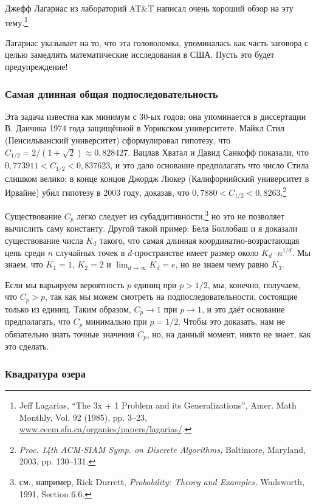 Джефф Лагариас из лабораторий AT\&T написал очень хороший обзор на эту тему.\footnote{Jeff Lagarias, ``The 3x + 1 Problem and its Generalizations'', Amer. Math Monthly, Vol. 92 (1985), pp. 3--23, \href{http://www.cecm.sfu.ca/organics/papers/lagarias/}{www.cecm.sfu.ca/organics/papers/lagarias/}.}

Лагариас указывает на то, что эта головоломка, упоминалась как часть заговора с целью замедлить математические исследования в США.
Пусть это будет предупреждение!

\subsubsection*{Самая длинная общая подпоследовательность}

Эта задача известна как минимум с 30-ых годов; она упоминается в диссертации В. Данчика 1974 года защищённой в Уорикском университете.
Майкл Стил (Пенсильванский университет) сформулировал гипотезу, что $C_{1/2} = 2/(1+\sqrt{2})\approx 0{,}828427$.
Вацлав Хватал и Давид Санкофф показали, что $0{,}773911 < C_{1/2} < 0{,}837623$, и это дало основание предполагать что число Стила слишком велико;
в конце концов Джордж Люкер (Калифорнийский университет в Ирвайне) убил гипотезу в 2003 году, доказав, что $0{,}7880 < C_{1/2} < 0{,}8263$.\footnote{\textit{Proc. 14th ACM-SIAM Symp. on Discrete Algorithms,} Baltimore, Maryland, 2003, pp. 130--131.}

Существование $C_p$ легко следует из субаддитивности,\footnote{см., например, Rick Durrett, \textit{Probability: Theory and Examples,} Wadsworth, 1991, Section 6.6.} но это не позволяет вычислить саму константу.
Другой такой пример: Бела Боллобаш и я доказали существование числа $K_d$ такого, что самая длинная координатно-возрастающая цепь среди $n$ случайных точек в $d$-пространстве имеет размер около $K_d\cdot n^{1/d}$.
Мы знаем, что $K_1=1$, $K_2=2$ и $\lim_{d\to\infty} K_d=e$, но не знаем чему равно $K_3$.

Если мы варьируем вероятность $p$ единиц при $p > 1/2$, мы, конечно, получаем, что $C_p>p$, так как мы можем смотреть на подпоследовательности, состоящие только из единиц.
Таким образом, $C_p\to 1$ при $p\to 1$, и это даёт основание предполагать, что $C_p$ минимально при $p=1/2$.
Чтобы это доказать, нам не обязательно знать точные значения $C_p$,
но, на данный момент, никто не знает, как это сделать. %

\subsubsection*{Квадратура озера}

